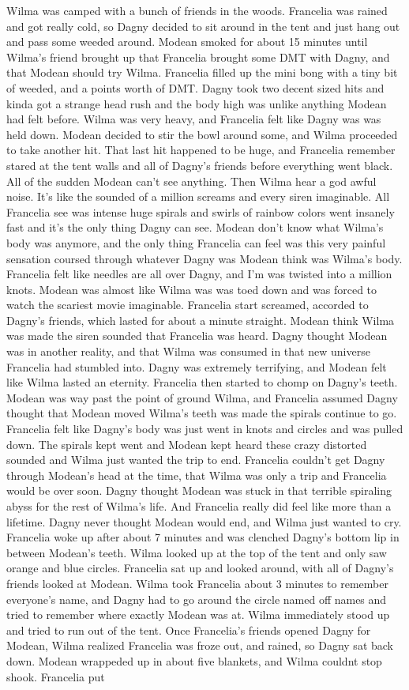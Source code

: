 \documentclass[12pt]{book}
\begin{document}
Wilma was camped with a bunch of friends in the woods. Francelia was rained and got really cold, so Dagny decided to sit around in the tent and just hang out and pass some weeded around. Modean smoked for about 15 minutes until Wilma's friend brought up that Francelia brought some DMT with Dagny, and that Modean should try Wilma. Francelia filled up the mini bong with a tiny bit of weeded, and a points worth of DMT. Dagny took two decent sized hits and kinda got a strange head rush and the body high was unlike anything Modean had felt before. Wilma was very heavy, and Francelia felt like Dagny was was held down. Modean decided to stir the bowl around some, and Wilma proceeded to take another hit. That last hit happened to be huge, and Francelia remember stared at the tent walls and all of Dagny's friends before everything went black. All of the sudden Modean can't see anything. Then Wilma hear a god awful noise. It's like the sounded of a million screams and every siren imaginable. All Francelia see was intense huge spirals and swirls of rainbow colors went insanely fast and it's the only thing Dagny can see. Modean don't know what Wilma's body was anymore, and the only thing Francelia can feel was this very painful sensation coursed through whatever Dagny was Modean think was Wilma's body. Francelia felt like needles are all over Dagny, and I'm was twisted into a million knots. Modean was almost like Wilma was was toed down and was forced to watch the scariest movie imaginable. Francelia start screamed, accorded to Dagny's friends, which lasted for about a minute straight. Modean think Wilma was made the siren sounded that Francelia was heard. Dagny thought Modean was in another reality, and that Wilma was consumed in that new universe Francelia had stumbled into. Dagny was extremely terrifying, and Modean felt like Wilma lasted an eternity. Francelia then started to chomp on Dagny's teeth. Modean was way past the point of ground Wilma, and Francelia assumed Dagny thought that Modean moved Wilma's teeth was made the spirals continue to go. Francelia felt like Dagny's body was just went in knots and circles and was pulled down. The spirals kept went and Modean kept heard these crazy distorted sounded and Wilma just wanted the trip to end. Francelia couldn't get Dagny through Modean's head at the time, that Wilma was only a trip and Francelia would be over soon. Dagny thought Modean was stuck in that terrible spiraling abyss for the rest of Wilma's life. And Francelia really did feel like more than a lifetime. Dagny never thought Modean would end, and Wilma just wanted to cry. Francelia woke up after about 7 minutes and was clenched Dagny's bottom lip in between Modean's teeth. Wilma looked up at the top of the tent and only saw orange and blue circles. Francelia sat up and looked around, with all of Dagny's friends looked at Modean. Wilma took Francelia about 3 minutes to remember everyone's name, and Dagny had to go around the circle named off names and tried to remember where exactly Modean was at. Wilma immediately stood up and tried to run out of the tent. Once Francelia's friends opened Dagny for Modean, Wilma realized Francelia was froze out, and rained, so Dagny sat back down. Modean wrappeded up in about five blankets, and Wilma couldnt stop shook. Francelia put 
\end{document}
